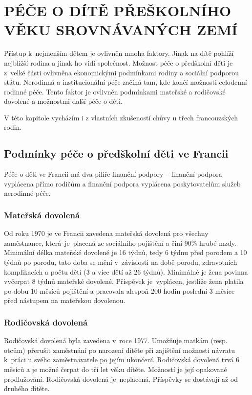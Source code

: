 \chapter{PÉČE O DÍTĚ PŘEŠKOLNÍHO VĚKU SROVNÁVANÝCH ZEMÍ}

	Přístup k nejmenším dětem je ovlivněn mnoha faktory. Jinak na dítě pohlíží nejbližší rodina a jinak ho vidí společnost. Možnost péče o předškolní děti je z velké části ovlivněna ekonomickými podmínkami rodiny a sociální podporou státu. Nerodinná a institucionální péče začíná tam, kde končí možnosti celodenní rodinné péče. Tento faktor je ovlivněn podmínkami mateřské a rodičovské dovolené a možnostmi další péče o děti.

	V této kapitole vycházím i z vlastních zkušeností chůvy u třech francouzských rodin. 

		\section{Podmínky péče o předškolní děti ve Francii}
		Péče o děti ve Francii má dva pilíře finanční podpory – finanční podpora vyplácena přímo rodičům a finanční podpora vyplácena poskytovatelům služeb nerodinné péče. 


			\subsection{Mateřská dovolená}
				Od roku 1970 je ve Francii zavedena mateřská dovolená pro všechny zaměstnance, která je placená ze sociálního pojištění a činí 90\% hrubé mzdy. Minimální délka mateřské dovolené je 16 týdnů, tedy 6 týdnu před porodem a 10 týdnů po porodu, tato doba se mění v závislosti na době porodu, zdravotních komplikacích a počtu dětí (3 a více dětí až 26 týdnů). Minimálně je žena povinna vyčerpat 8 týdnů mateřské dovolené. Příspěvek je vyplácen, jestliže žena platila po dobu 10 měsíců pojištění a pracovala alespoň 200 hodin poslední 3 měsíce před nástupem na mateřskou dovolenou. \citep{Dennipece}

			\subsection{Rodičovská dovolená}
				Rodičovská dovolená byla zavedena v roce 1977. Umožňuje matkám (resp. otcům) přerušit zaměstnání po narození dítěte při zajištění možnosti návratu k práci u svého zaměstnavatele po jejím ukončení. Rodičovská dovolená trvá 6 měsíců a je možné čerpat do tří let věku dítěte. Možností je její opakované prodlužování. Rodičovská dovolená je neplacená. Příspěvky se dostávají až od druhého dítěte. 

